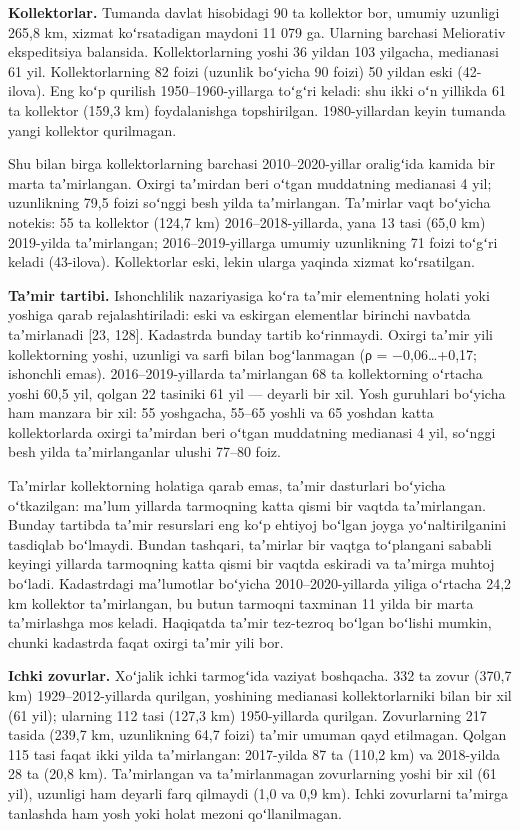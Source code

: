 \documentclass[14pt,a4paper,oneside]{extreport}
\begin{document}
\textbf{Kollektorlar.} Tumanda davlat hisobidagi 90 ta kollektor bor,
umumiy uzunligi 265,8 km, xizmat koʻrsatadigan maydoni 11 079 ga.
Ularning barchasi Meliorativ ekspeditsiya balansida. Kollektorlarning
yoshi 36 yildan 103 yilgacha, medianasi 61 yil. Kollektorlarning 82
foizi (uzunlik boʻyicha 90 foizi) 50 yildan eski (42-ilova). Eng koʻp
qurilish 1950--1960-yillarga toʻgʻri keladi: shu ikki oʻn yillikda 61 ta
kollektor (159,3 km) foydalanishga topshirilgan. 1980-yillardan keyin
tumanda yangi kollektor qurilmagan.

Shu bilan birga kollektorlarning barchasi 2010--2020-yillar oraligʻida
kamida bir marta taʼmirlangan. Oxirgi taʼmirdan beri oʻtgan muddatning
medianasi 4 yil; uzunlikning 79,5 foizi soʻnggi besh yilda taʼmirlangan.
Taʼmirlar vaqt boʻyicha notekis: 55 ta kollektor (124,7 km)
2016--2018-yillarda, yana 13 tasi (65,0 km) 2019-yilda taʼmirlangan;
2016--2019-yillarga umumiy uzunlikning 71 foizi toʻgʻri keladi
(43-ilova). Kollektorlar eski, lekin ularga yaqinda xizmat koʻrsatilgan.

\textbf{Taʼmir tartibi.} Ishonchlilik nazariyasiga koʻra taʼmir
elementning holati yoki yoshiga qarab rejalashtiriladi: eski va eskirgan
elementlar birinchi navbatda taʼmirlanadi {[}23, 128{]}. Kadastrda
bunday tartib koʻrinmaydi. Oxirgi taʼmir yili kollektorning yoshi,
uzunligi va sarfi bilan bogʻlanmagan (ρ = −0,06\ldots+0,17; ishonchli
emas). 2016--2019-yillarda taʼmirlangan 68 ta kollektorning oʻrtacha
yoshi 60,5 yil, qolgan 22 tasiniki 61 yil --- deyarli bir xil. Yosh
guruhlari boʻyicha ham manzara bir xil: 55 yoshgacha, 55--65 yoshli va
65 yoshdan katta kollektorlarda oxirgi taʼmirdan beri oʻtgan muddatning
medianasi 4 yil, soʻnggi besh yilda taʼmirlanganlar ulushi 77--80 foiz.

Taʼmirlar kollektorning holatiga qarab emas, taʼmir dasturlari boʻyicha
oʻtkazilgan: maʼlum yillarda tarmoqning katta qismi bir vaqtda
taʼmirlangan. Bunday tartibda taʼmir resurslari eng koʻp ehtiyoj boʻlgan
joyga yoʻnaltirilganini tasdiqlab boʻlmaydi. Bundan tashqari, taʼmirlar
bir vaqtga toʻplangani sababli keyingi yillarda tarmoqning katta qismi
bir vaqtda eskiradi va taʼmirga muhtoj boʻladi. Kadastrdagi maʼlumotlar
boʻyicha 2010--2020-yillarda yiliga oʻrtacha 24,2 km kollektor
taʼmirlangan, bu butun tarmoqni taxminan 11 yilda bir marta taʼmirlashga
mos keladi. Haqiqatda taʼmir tez-tezroq boʻlgan boʻlishi mumkin, chunki
kadastrda faqat oxirgi taʼmir yili bor.

\textbf{Ichki zovurlar.} Xoʻjalik ichki tarmogʻida vaziyat boshqacha.
332 ta zovur (370,7 km) 1929--2012-yillarda qurilgan, yoshining
medianasi kollektorlarniki bilan bir xil (61 yil); ularning 112 tasi
(127,3 km) 1950-yillarda qurilgan. Zovurlarning 217 tasida (239,7 km,
uzunlikning 64,7 foizi) taʼmir umuman qayd etilmagan. Qolgan 115 tasi
faqat ikki yilda taʼmirlangan: 2017-yilda 87 ta (110,2 km) va 2018-yilda
28 ta (20,8 km). Taʼmirlangan va taʼmirlanmagan zovurlarning yoshi bir
xil (61 yil), uzunligi ham deyarli farq qilmaydi (1,0 va 0,9 km). Ichki
zovurlarni taʼmirga tanlashda ham yosh yoki holat mezoni qoʻllanilmagan.
\end{document}
